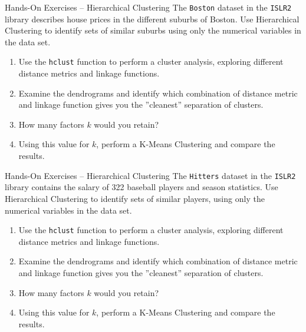 \documentclass[ignorenonframetext,xcolor=x11names]{beamer}
\begin{document}
\begin{frame}{Hands-On Exercises -- Hierarchical Clustering}
The \texttt{Boston} dataset in the \texttt{ISLR2} library describes house prices in the different suburbs of Boston. Use Hierarchical Clustering to identify sets of similar suburbs using only the numerical variables in the data set.
\begin{enumerate}
   \item Use the \texttt{hclust} function to perform a cluster analysis, exploring different distance metrics and linkage functions.
   \item Examine the dendrograms and identify which combination of distance metric and linkage function gives you the ''cleanest'' separation of clusters.
   \item How many factors $k$ would you retain?
   \item Using this value for $k$, perform a K-Means Clustering and compare the results.
\end{enumerate}
\end{frame}

\begin{frame}{Hands-On Exercises -- Hierarchical Clustering}
The \texttt{Hitters} dataset in the \texttt{ISLR2} library contains the salary of 322 baseball players and season statistics. Use Hierarchical Clustering to identify sets of similar players, using only the numerical variables in the data set.

\begin{enumerate}
   \item Use the \texttt{hclust} function to perform a cluster analysis, exploring different distance metrics and linkage functions.
   \item Examine the dendrograms and identify which combination of distance metric and linkage function gives you the ''cleanest'' separation of clusters.
   \item How many factors $k$ would you retain?
   \item Using this value for $k$, perform a K-Means Clustering and compare the results.
\end{enumerate}
\end{frame}
\end{document}
